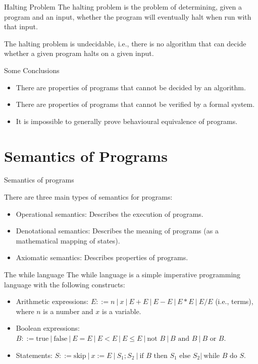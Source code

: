 \documentclass{beamer}
\begin{document}
        \begin{frame}{Halting Problem}
          The halting problem is the problem of determining, given a program and an input, whether the program will eventually halt when run with that input.
          
          The halting problem is undecidable, i.e., there is no algorithm that can decide whether a given program halts on a given input.
        \end{frame}

        \begin{frame}{Some Conclusions}
          \begin{itemize}
            \item There are properties of programs that cannot be decided by an algorithm. 
            \item There are properties of programs that cannot be verified by a formal system.
            \item It is impossible to generally prove behavioural equivalence of programs.
          \end{itemize}
        
          
        \end{frame}
\section{Semantics of Programs}


\begin{frame}{Semantics of programs}

  There are three main types of semantics for programs:
  \begin{itemize}
  \item Operational semantics: Describes the execution of programs.
  \item Denotational semantics: Describes the meaning of programs (as a mathematical mapping of states).
  \item Axiomatic semantics: Describes properties of programs.
  \end{itemize}
  \end{frame}
  \begin{frame}{The while language}
    The while language is a simple imperative programming language with the following constructs:
    \begin{itemize}
      \item Arithmetic expressions: $E::=n\ |\ x\ |\ E+E\ |\ E-E\ |\ E*E\ |\ E/E$ (i.e., terms), where $n$ is a number and $x$ is a variable.
      \item Boolean expressions: $B::=\text{true}\ |\ \text{false}\ |\ E=E\ |\ E<E\ |\ E\leq E\ |\ \text{not } B\ |\ B \text{ and } B\ |\ B\text{ or } B$.
      \item Statements: $S::=\text{skip}\ |\ x:=E\ |\ S_1;S_2\ |\ \text{if }B\text{ then }S_1\text{ else }S_2 |\ \text{while }B\text{ do }S$.
    \end{itemize}
    
    \end{frame}
\end{document}
